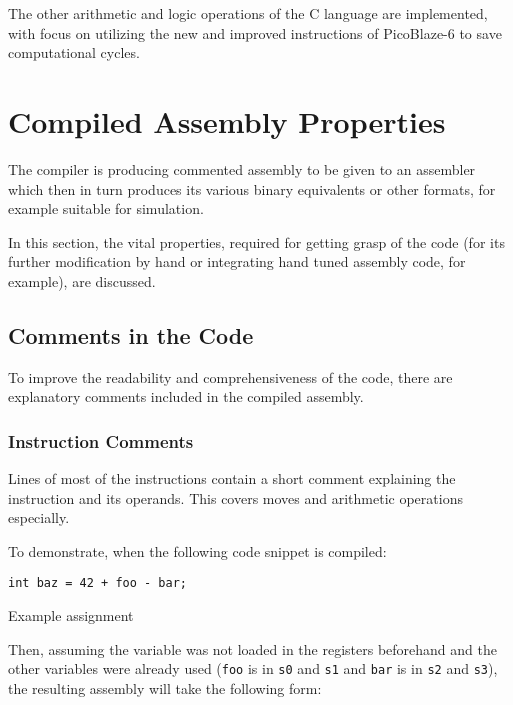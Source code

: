         The other arithmetic and logic operations of the C language are implemented, with focus on utilizing the new and improved instructions of PicoBlaze-6 to save computational cycles.



    \section{Compiled Assembly Properties}

    The compiler is producing commented assembly to be given to an assembler which then in turn produces its various binary equivalents or other formats, for example suitable for simulation.

    In this section, the vital properties, required for getting grasp of the code (for its further modification by hand or integrating hand tuned assembly code, for example), are discussed.

        \subsection{Comments in the Code}

        To improve the readability and comprehensiveness of the code, there are explanatory comments included in the compiled assembly.

            \subsubsection{Instruction Comments}

            Lines of most of the instructions contain a short comment explaining the instruction and its operands. This covers moves and arithmetic operations especially.

            To demonstrate, when the following code snippet is compiled:

            \begin{listing}
            \centering
            \texttt{int baz = 42 + foo - bar;}
            \caption{Example assignment}\label{lst:assign}
            \end{listing}

            Then, assuming the variable was not loaded in the registers beforehand and the other variables were already used (\texttt{foo} is in \texttt{s0} and \texttt{s1} and \texttt{bar} is in \texttt{s2} and \texttt{s3}), the resulting assembly will take the following form:

